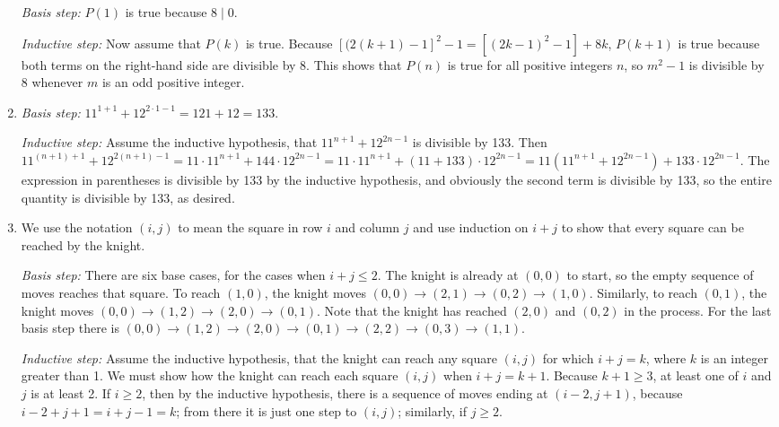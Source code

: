 \documentclass{../../cls/sig-alternate-05-2015}
\begin{document}
\begin{enumerate}
\textit{Basis step:} $P(1)$ is true because $8 \mid 0$.

\textit{Inductive step:} Now assume that $P(k)$ is true.
Because $[(2(k + 1) - 1]^2 - 1 = [(2k - 1)^2 - 1] + 8k$,
$P(k + 1)$ is true because both terms on the right-hand side are divisible by 8.
This shows that $P(n)$ is true for all positive integers $n$,
so $m^2 - 1$ is divisible by 8 whenever $m$ is an odd positive integer.

\item \textit{Basis step:} $11^{1 + 1} + 12^{2 \cdot 1 - 1} = 121 + 12 = 133$.

\textit{Inductive step:} Assume the inductive hypothesis,
that $11^{n + 1} + 12^{2n - 1}$ is divisible by 133.
Then $11^{(n + 1) + 1} + 12^{2(n+1) - 1} = 11 \cdot 11^{n + 1} + 144 \cdot 12^{2n - 1} = 11 \cdot 11^{n + 1} + (11 + 133) \cdot 12^{2n - 1} = 11(11^{n + 1} + 12^{2n - 1}) + 133 \cdot 12^{2n - 1}$.
The expression in parentheses is divisible by 133 by the inductive hypothesis,
and obviously the second term is divisible by 133,
so the entire quantity is divisible by 133, as desired.

\item We use the notation $(i, j)$ to mean the square
in row $i$ and column $j$ and use induction on $i + j$ to show that every square can be reached by the knight.

\textit{Basis step:} There are six base cases, for the cases when $i + j \le 2$.
The knight is already at $(0, 0)$ to start,
so the empty sequence of moves reaches that square.
To reach $(1, 0)$,
the knight moves $(0, 0) \rightarrow (2, 1) \rightarrow (0, 2) \rightarrow (1, 0)$.
Similarly, to reach $(0, 1)$,
the knight moves $(0, 0) \rightarrow (1, 2) \rightarrow (2, 0) \rightarrow (0, 1)$.
Note that the knight has reached $(2, 0)$ and $(0, 2)$ in the process.
For the last basis step there is $(0, 0) \rightarrow (1, 2) \rightarrow (2, 0) \rightarrow (0, 1) \rightarrow (2, 2) \rightarrow (0, 3) \rightarrow (1, 1)$.

\textit{Inductive step:} Assume the inductive hypothesis,
that the knight can reach any square $(i, j)$ for which $i + j = k$,
where $k$ is an integer greater than 1.
We must show how the knight can reach each square $(i, j)$ when $i + j = k + 1$.
Because $k + 1 \ge 3$,
at least one of $i$ and $j$ is at least 2.
If $i \ge 2$,
then by the inductive hypothesis,
there is a sequence of moves ending at $(i - 2, j + 1)$,
because $i - 2 + j + 1 = i + j - 1 = k$;
from there it is just one step to $(i, j)$;
similarly, if $j \ge 2$.


\end{enumerate}
\end{document}
